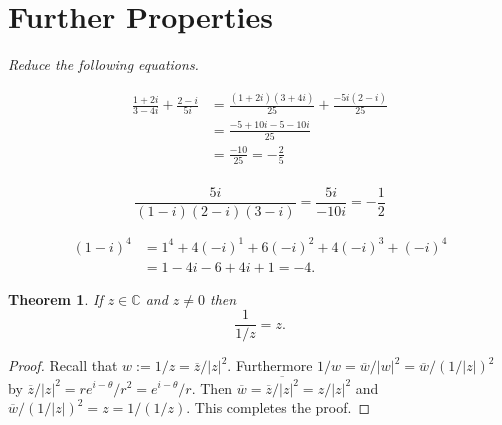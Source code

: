 \documentclass[letter]{article}
\newtheorem{theorem}{Theorem}
\newenvironment{menumerate}{%
  \edef\backupindent{\the\parindent}%
  \enumerate%
  \setlength{\parindent}{\backupindent}%
}{\endenumerate}
\begin{document}
\section{Further Properties}
\begin{menumerate}
	\item \emph{Reduce the following equations.}
	\begin{menumerate}
		\item \begin{equation}
			\begin{aligned}
				\frac{1 + 2i}{3 - 4i} + \frac{2-i}{5i} &= \frac{(1+2i)(3+4i)}{25} + \frac{-5i(2-i)}{25} \\
				&= \frac{-5 + 10i -5 - 10i}{25}\\
				 &= \frac{-10}{25} = -\frac{2}{5}\\
			\end{aligned}
		\end{equation}

		\item \begin{equation}
			\frac{5i}{(1-i)(2-i)(3-i)} = \frac{5i}{-10i} = -\frac{1}{2}
		\end{equation}

		\item \begin{equation}
			\begin{aligned}
				(1-i)^4 &= 1^4 + 4(-i)^1 + 6(-i)^2 + 4(-i)^3 + (-i)^4 \\	
				&= 1 -4i -6 +4i +1 = -4.	
			\end{aligned}
		\end{equation}
	\end{menumerate}
	\item \begin{theorem} 
			If $z \in \mathbb{C}$ and $z \neq 0$ then
			\begin{equation}
				\frac{1}{1/z} = z.
			\end{equation}
		\end{theorem}
		\begin{proof}
			Recall that $w:= 1/z = \overline{z}/|z|^2$.
			Furthermore $1/w = \overline{w}/|w|^2 = \overline{w}/(1/|z|)^2$ by $\overline{z}/|z|^2 = re^{i-\theta}/r^2 = e^{i-\theta}/r$. Then $\overline{w} = \overline{\overline{z}/|z|^2} = z/|z|^2$ and $\overline{w}/(1/|z|)^2 = z = 1/(1/z).$ This completes the proof.	
		\end{proof}
\end{menumerate}
\end{document}
